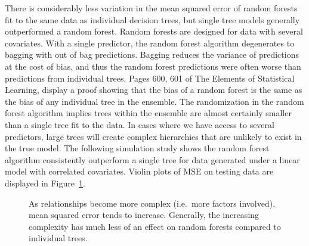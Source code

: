 \documentclass[
  12pt,
  letterpaper,
  DIV=11,
  numbers=noendperiod]{scrartcl}
\begin{document}
There is considerably less variation in the mean squared error of random
forests fit to the same data as individual decision trees, but single
tree models generally outperformed a random forest. Random forests are
designed for data with several covariates. With a single predictor, the
random forest algorithm degenerates to bagging with out of bag
predictions. Bagging reduces the variance of predictions at the cost of
bias, and thus the random forest predictions were often worse than
predictions from individual trees. Pages 600, 601 of The Elements of
Statistical Learning, \citep{esl} display a proof showing that the bias
of a random forest is the same as the bias of any individual tree in the
ensemble. The randomization in the random forest algorithm implies trees
within the ensemble are almost certainly smaller than a single tree fit
to the data. In cases where we have access to several predictors, large
trees will create complex hierarchies that are unlikely to exist in the
true model. The following simulation study shows the random forest
algorithm consistently outperform a single tree for data generated under
a linear model with correlated covariates. Violin plots of MSE on
testing data are displayed in Figure~\ref{fig-sim2}.

\begin{figure}[H]


\caption{\label{fig-sim2}As relationships become more complex (i.e.~more
factors involved), mean squared error tends to increase. Generally, the
increasing complexity has much less of an effect on random forests
compared to individual trees.}

\end{figure}%
\end{document}
